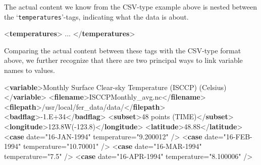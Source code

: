 \documentclass[
  12pt,
]{style/krantz}
\newenvironment{Shaded}{\begin{snugshade}}{\end{snugshade}}
\newcommand{\KeywordTok}[1]{\textcolor[rgb]{0.13,0.29,0.53}{\textbf{#1}}}
\newcommand{\NormalTok}[1]{#1}
\newcommand{\OtherTok}[1]{\textcolor[rgb]{0.56,0.35,0.01}{#1}}
\newcommand{\StringTok}[1]{\textcolor[rgb]{0.31,0.60,0.02}{#1}}
\begin{document}
The actual content we know from the CSV-type example above is nested between the `\texttt{temperatures}'-tags, indicating what the data is about.

\begin{Shaded}
\begin{Highlighting}[]
\NormalTok{  \textless{}}\KeywordTok{temperatures}\NormalTok{\textgreater{}}
\NormalTok{...}
\NormalTok{  \textless{}/}\KeywordTok{temperatures}\NormalTok{\textgreater{}}
\end{Highlighting}
\end{Shaded}

Comparing the actual content between these tags with the CSV-type format above, we further recognize that there are two principal ways to link variable names to values.

\begin{Shaded}
\begin{Highlighting}[]
\NormalTok{    \textless{}}\KeywordTok{variable}\NormalTok{\textgreater{}Monthly Surface Clear{-}sky Temperature (ISCCP) (Celsius)\textless{}/}\KeywordTok{variable}\NormalTok{\textgreater{}}
\NormalTok{    \textless{}}\KeywordTok{filename}\NormalTok{\textgreater{}ISCCPMonthly\_avg.nc\textless{}/}\KeywordTok{filename}\NormalTok{\textgreater{}}
\NormalTok{    \textless{}}\KeywordTok{filepath}\NormalTok{\textgreater{}/usr/local/fer\_data/data/\textless{}/}\KeywordTok{filepath}\NormalTok{\textgreater{}}
\NormalTok{    \textless{}}\KeywordTok{badflag}\NormalTok{\textgreater{}{-}1.E+34\textless{}/}\KeywordTok{badflag}\NormalTok{\textgreater{}}
\NormalTok{    \textless{}}\KeywordTok{subset}\NormalTok{\textgreater{}48 points (TIME)\textless{}/}\KeywordTok{subset}\NormalTok{\textgreater{}}
\NormalTok{    \textless{}}\KeywordTok{longitude}\NormalTok{\textgreater{}123.8W({-}123.8)\textless{}/}\KeywordTok{longitude}\NormalTok{\textgreater{}}
\NormalTok{    \textless{}}\KeywordTok{latitude}\NormalTok{\textgreater{}48.8S\textless{}/}\KeywordTok{latitude}\NormalTok{\textgreater{}}
\NormalTok{    \textless{}}\KeywordTok{case}\OtherTok{ date=}\StringTok{"16{-}JAN{-}1994"}\OtherTok{ temperature=}\StringTok{"9.200012"}\NormalTok{ /\textgreater{}}
\NormalTok{    \textless{}}\KeywordTok{case}\OtherTok{ date=}\StringTok{"16{-}FEB{-}1994"}\OtherTok{ temperature=}\StringTok{"10.70001"}\NormalTok{ /\textgreater{}}
\NormalTok{    \textless{}}\KeywordTok{case}\OtherTok{ date=}\StringTok{"16{-}MAR{-}1994"}\OtherTok{ temperature=}\StringTok{"7.5"}\NormalTok{ /\textgreater{}}
\NormalTok{    \textless{}}\KeywordTok{case}\OtherTok{ date=}\StringTok{"16{-}APR{-}1994"}\OtherTok{ temperature=}\StringTok{"8.100006"}\NormalTok{ /\textgreater{}}
\end{Highlighting}
\end{Shaded}
\end{document}

